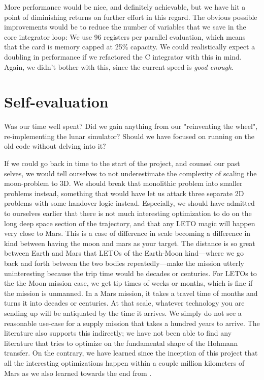 More performance would be nice, and definitely achievable, but we have hit a point of diminishing returns on further effort in this regard. The obvious possible improvements would be to reduce the number of variables that we save in the core integrator loop: We use 96 registers per parallel evaluation, which means that the card is memory capped at 25\% capacity. We could realistically expect a doubling in performance if we refactored the C integrator with this in mind. Again, we didn't bother with this, since the current speed is \textit{good enough}.

\section{Self-evaluation}
Was our time well spent? Did we gain anything from our "reinventing the wheel", re-implementing the lunar simulator? Should we have focused on running on the old code without delving into it?

If we could go back in time to the start of the project, and counsel our past selves, we would tell ourselves to not underestimate the complexity of scaling the moon-problem to 3D. We should break that monolithic problem into smaller problems instead, something that would have let us attack three separate 2D problems with some handover logic instead. Especially, we should have admitted to ourselves earlier that there is not much interesting optimization to do on the long deep space section of the trajectory, and that any LETO magic will happen very close to Mars. This is a case of difference in scale becoming a difference in kind between having the moon and mars as your target. The distance is so great between Earth and Mars that LETOs of the Earth-Moon kind---where we go back and forth between the two bodies repeatedly---make the mission utterly uninteresting because the trip time would be decades or centuries. For LETOs to the the Moon mission case, we get tip times of weeks or months, which is fine if the mission is unmanned. In a Mars mission, it takes a travel time of months and turns it into decades or centuries. At that scale, whatever technology you are sending up will be antiquated by the time it arrives. We simply do not see a reasonable use-case for a supply mission that takes a hundred years to arrive. The literature also supports this indirectly; we have not been able to find any literature that tries to optimize on the fundamental shape of the Hohmann transfer. On the contrary, we have learned since the inception of this project that all the interesting optimizations happen within a couple million kilometers of Mars as we also learned towards the end from \cite{Topputo2014}.